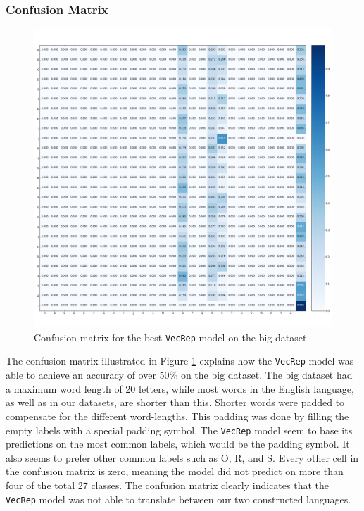 \subsubsection{Confusion Matrix}
\begin{figure}[h]
    \centering
    \includegraphics[width=1\textwidth]{fig/results/experiment1/big/vecrep/confusion_matrix.png}
    \caption{Confusion matrix for the best {\tt VecRep} model on the big dataset}
    \label{fig:result1_big_vecrep_confusion_matrix}
\end{figure}

The confusion matrix illustrated in Figure \ref{fig:result1_big_vecrep_confusion_matrix} explains how the {\tt VecRep} model was able to achieve an accuracy of over 50\% on the big dataset. The big dataset had a maximum word length of 20 letters, while most words in the English language, as well as in our datasets, are shorter than this. Shorter words were padded to compensate for the different word-lengths. This padding was done by filling the empty labels with a special padding symbol. The {\tt VecRep} model seem to base its predictions on the most common labels, which would be the padding symbol. It also seems to prefer other common labels such as O, R, and S. Every other cell in the confusion matrix is zero, meaning the model did not predict on more than four of the total 27 classes. The confusion matrix clearly indicates that the {\tt VecRep} model was not able to translate between our two constructed languages. 

